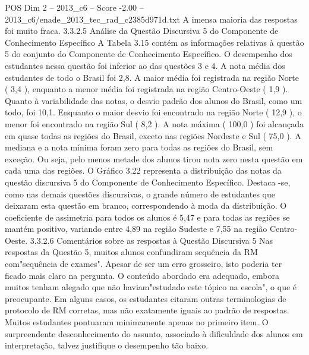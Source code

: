 \begin{textsample}{POS Dim 2 – 2013\_c6 – Score -2.00 – 2013\_c6/enade\_2013\_tec\_rad\_c2385d971d.txt}
A imensa maioria das respostas foi muito fraca. 3.3.2.5 Análise da Questão Discursiva 5 do Componente de Conhecimento Específico A Tabela 3.15 contém as informações relativas à questão 5 do conjunto do Componente de Conhecimento Específico.
O desempenho dos estudantes nessa questão foi inferior ao das questões 3 e 4.
A nota média dos estudantes de todo o Brasil foi 2,8.
A maior média foi registrada na região Norte ( 3,4 ), enquanto a menor média foi registrada na região Centro-Oeste ( 1,9 ).
Quanto à variabilidade das notas, o desvio padrão dos alunos do Brasil, como um todo, foi 10,1.
Enquanto o maior desvio foi encontrado na região Norte ( 12,9 ), o menor foi encontrado na região Sul ( 8,2 ).
A nota máxima ( 100,0 ) foi alcançada em quase todas as regiões do Brasil, exceto nas regiões Nordeste e Sul ( 75,0 ).
A mediana e a nota mínima foram zero para todas as regiões do Brasil, sem exceção.
Ou seja, pelo menos metade dos alunos tirou nota zero nesta questão em cada uma das regiões.
O Gráfico 3.22 representa a distribuição das notas da questão discursiva 5 do Componente de Conhecimento Específico.
Destaca -se, como nas demais questões discursivas, o grande número de estudantes que deixaram esta questão em branco, correspondendo à moda da distribuição.
O coeficiente de assimetria para todos os alunos é 5,47 e para todas as regiões se mantém positivo, variando entre 4,89 na região Sudeste e 7,55 na região Centro-Oeste. 3.3.2.6 Comentários sobre as respostas à Questão Discursiva 5 Nas respostas da Questão 5, muitos alunos confundiram sequência da RM com"sequência de exames".
Apesar de ser um erro grosseiro, isto poderia ter ficado mais claro na pergunta.
O conteúdo abordado era adequado, embora muitos tenham alegado que não haviam"estudado este tópico na escola", o que é preocupante.
Em alguns casos, os estudantes citaram outras terminologias de protocolo de RM corretas, mas não exatamente iguais ao padrão de respostas.
Muitos estudantes pontuaram minimamente apenas no primeiro item.
O surpreendente desconhecimento do assunto, associado à dificuldade dos alunos em interpretação, talvez justifique o desempenho tão baixo.

\end{textsample}
